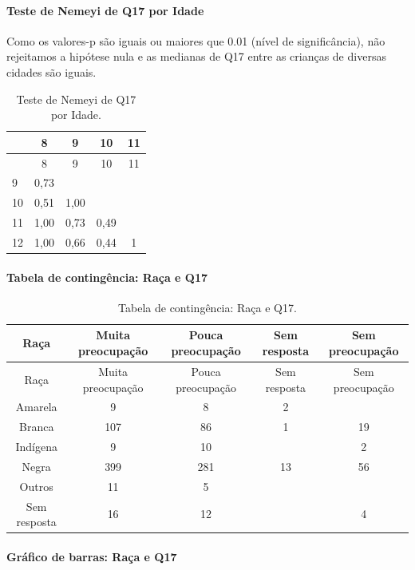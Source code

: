 \documentclass[]{article}
\let\oldparagraph\paragraph
\renewcommand{\paragraph}[1]{\oldparagraph{#1}\mbox{}}
\begin{document}
\hypertarget{teste-de-nemeyi-de-q17-por-idade}{%
\paragraph{Teste de Nemeyi de Q17 por Idade}\label{teste-de-nemeyi-de-q17-por-idade}}

Como os valores-p são iguais ou maiores que 0.01 (nível de significância), não rejeitamos a hipótese nula e as medianas de Q17 entre as crianças de diversas cidades são iguais.

\begin{longtable}[]{@{}lcccc@{}}
\caption{\label{tab:unnamed-chunk-218}Teste de Nemeyi de Q17 por Idade.}\tabularnewline
\toprule
& 8 & 9 & 10 & 11\tabularnewline
\midrule
\endfirsthead
\toprule
& 8 & 9 & 10 & 11\tabularnewline
\midrule
\endhead
9 & 0,73 & & &\tabularnewline
10 & 0,51 & 1,00 & &\tabularnewline
11 & 1,00 & 0,73 & 0,49 &\tabularnewline
12 & 1,00 & 0,66 & 0,44 & 1\tabularnewline
\bottomrule
\end{longtable}

\cleardoublepage

\hypertarget{tabela-de-continguxeancia-rauxe7a-e-q17}{%
\paragraph{Tabela de contingência: Raça e Q17}\label{tabela-de-continguxeancia-rauxe7a-e-q17}}

\begin{longtable}[]{@{}ccccc@{}}
\caption{\label{tab:unnamed-chunk-219}Tabela de contingência: Raça e Q17.}\tabularnewline
\toprule
Raça & Muita preocupação & Pouca preocupação & Sem resposta & Sem preocupação\tabularnewline
\midrule
\endfirsthead
\toprule
Raça & Muita preocupação & Pouca preocupação & Sem resposta & Sem preocupação\tabularnewline
\midrule
\endhead
Amarela & 9 & 8 & 2 &\tabularnewline
Branca & 107 & 86 & 1 & 19\tabularnewline
Indígena & 9 & 10 & & 2\tabularnewline
Negra & 399 & 281 & 13 & 56\tabularnewline
Outros & 11 & 5 & &\tabularnewline
Sem resposta & 16 & 12 & & 4\tabularnewline
\bottomrule
\end{longtable}

\hypertarget{gruxe1fico-de-barras-rauxe7a-e-q17}{%
\paragraph{Gráfico de barras: Raça e Q17}\label{gruxe1fico-de-barras-rauxe7a-e-q17}}
\end{document}
